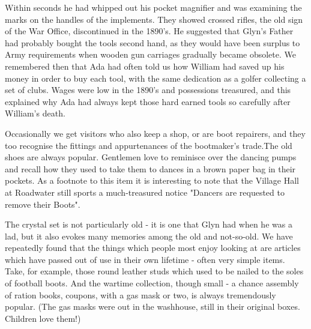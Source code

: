 Within seconds he had whipped out his pocket magnifier and was examining the marks on the handles of the implements. They showed crossed rifles, the old sign of the War Office, discontinued in the 1890’s. He suggested that Glyn's Father had probably bought the tools second hand, as they would have been surplus to Army requirements when wooden gun carriages gradually became obsolete. We remembered then that Ada had often told us how William had saved up his money in order to buy each tool, with the same dedication as a golfer collecting a set of clubs. Wages were low in the 1890’s and possessions treasured, and this explained why Ada had always kept those hard earned tools so carefully after William's death.

Occasionally we get visitors who also keep a shop, or are boot repairers, and they too recognise the fittings and appurtenances of the bootmaker's trade.The old shoes are always popular. Gentlemen love to reminisce over the dancing pumps and recall how they used to take them to dances in a brown paper bag in their pockets. As a footnote to this item it is interesting to note that the Village Hall at Roadwater still sports a much-treasured notice "Dancers are requested to remove their Boots".

The crystal set is not particularly old - it is one that Glyn had when he was a lad, but it also evokes many memories among the old and not-so-old. We have repeatedly found that the things which people most enjoy looking at are articles which have passed out of use in their own lifetime - often very simple items. Take, for example, those round leather studs which used to be nailed to the soles of football boots. And the wartime collection, though small - a chance assembly of ration books, coupons, with a gas mask or two, is always tremendously popular. (The gas masks were out in the washhouse, still in their original boxes. Children love them!)

